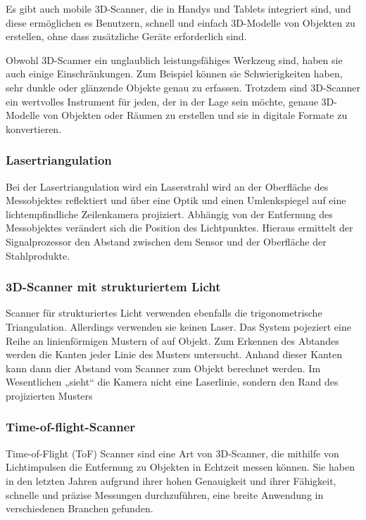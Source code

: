 Es gibt auch mobile 3D-Scanner, die in Handys und Tablets integriert sind, und diese ermöglichen es Benutzern, schnell und einfach 3D-Modelle von Objekten zu erstellen, ohne dass zusätzliche Geräte erforderlich sind.

Obwohl 3D-Scanner ein unglaublich leistungsfähiges Werkzeug sind, haben sie auch einige Einschränkungen. Zum Beispiel können sie Schwierigkeiten haben, sehr dunkle oder glänzende Objekte genau zu erfassen. Trotzdem sind 3D-Scanner ein wertvolles Instrument für jeden, der in der Lage sein möchte, genaue 3D-Modelle von Objekten oder Räumen zu erstellen und sie in digitale Formate zu konvertieren.

\subsubsection{Lasertriangulation}
Bei der Lasertriangulation wird ein Laserstrahl wird an der Oberfläche des Messobjektes reflektiert und über eine Optik und einen Umlenkspiegel auf eine lichtempfindliche Zeilenkamera projiziert. Abhängig von der Entfernung des Messobjektes verändert sich die Position des Lichtpunktes. Hieraus ermittelt der Signalprozessor den Abstand zwischen dem Sensor und der Oberfläche der Stahlprodukte.

\subsubsection{3D-Scanner mit strukturiertem Licht}
Scanner für strukturiertes Licht verwenden ebenfalls die trigonometrische Triangulation. Allerdings verwenden sie keinen Laser. Das System pojeziert eine Reihe an linienförmigen Mustern of auf Objekt. Zum Erkennen des Abtandes werden die Kanten jeder Linie des Musters untersucht. Anhand dieser Kanten kann dann dier Abstand vom Scanner zum Objekt berechnet werden. Im Wesentlichen „sieht“ die Kamera nicht eine Laserlinie, sondern den Rand des projizierten Musters

\subsubsection{Time-of-flight-Scanner}
Time-of-Flight (ToF) Scanner sind eine Art von 3D-Scanner, die mithilfe von Lichtimpulsen die Entfernung zu Objekten in Echtzeit messen können. Sie haben in den letzten Jahren aufgrund ihrer hohen Genauigkeit und ihrer Fähigkeit, schnelle und präzise Messungen durchzuführen, eine breite Anwendung in verschiedenen Branchen gefunden.

